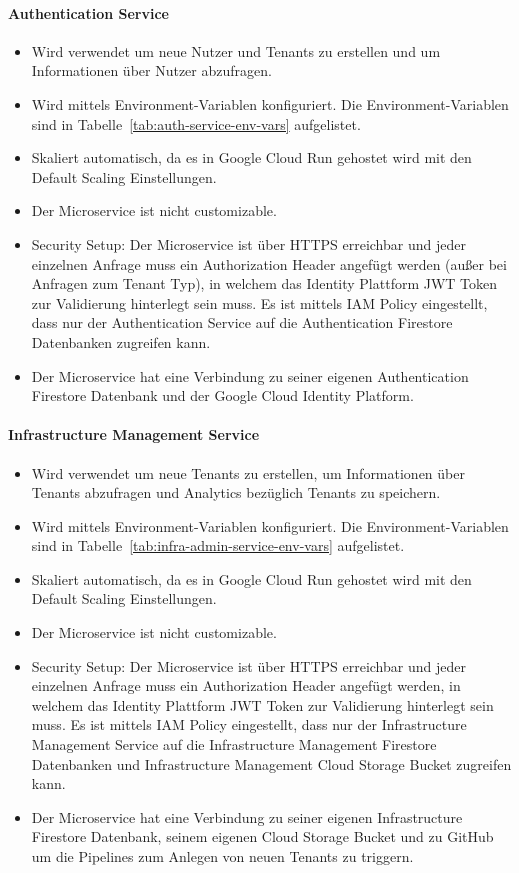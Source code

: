 \paragraph{Authentication Service}
\begin{itemize}
	\item Wird verwendet um neue Nutzer und Tenants zu erstellen und um Informationen über Nutzer abzufragen.
	\item Wird mittels Environment-Variablen konfiguriert. Die Environment-Variablen sind in Tabelle~\ref{tab:auth-service-env-vars} aufgelistet.
	\item Skaliert automatisch, da es in Google Cloud Run gehostet wird mit den Default Scaling Einstellungen.
	\item Der Microservice ist nicht customizable.
	\item Security Setup: Der Microservice ist über HTTPS erreichbar und jeder einzelnen Anfrage muss ein Authorization Header angefügt werden (außer bei Anfragen zum Tenant Typ), in welchem das Identity Plattform JWT Token zur Validierung hinterlegt sein muss. Es ist mittels IAM Policy eingestellt, dass nur der Authentication Service auf die Authentication Firestore Datenbanken zugreifen kann.
	\item Der Microservice hat eine Verbindung zu seiner eigenen Authentication Firestore Datenbank und der Google Cloud Identity Platform.
\end{itemize}

\paragraph{Infrastructure Management Service}
\begin{itemize}
	\item Wird verwendet um neue Tenants zu erstellen, um Informationen über Tenants abzufragen und Analytics bezüglich Tenants zu speichern.
	\item Wird mittels Environment-Variablen konfiguriert. Die Environment-Variablen sind in Tabelle~\ref{tab:infra-admin-service-env-vars} aufgelistet.
	\item Skaliert automatisch, da es in Google Cloud Run gehostet wird mit den Default Scaling Einstellungen.
	\item Der Microservice ist nicht customizable.
	\item Security Setup: Der Microservice ist über HTTPS erreichbar und jeder einzelnen Anfrage muss ein Authorization Header angefügt werden, in welchem das Identity Plattform JWT Token zur Validierung hinterlegt sein muss. Es ist mittels IAM Policy eingestellt, dass nur der Infrastructure Management Service auf die Infrastructure Management Firestore Datenbanken und Infrastructure Management Cloud Storage Bucket zugreifen kann.
	\item Der Microservice hat eine Verbindung zu seiner eigenen Infrastructure Firestore Datenbank, seinem eigenen Cloud Storage Bucket und zu GitHub um die Pipelines zum Anlegen von neuen Tenants zu triggern.
\end{itemize}

